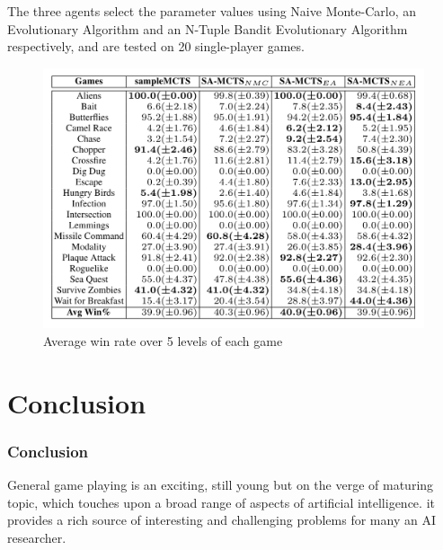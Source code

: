\documentclass{beamer}
\begin{document}
\begin{frame}[allowframebreaks]
  The three agents select the parameter values using Naive Monte-Carlo, an Evolutionary Algorithm and an N-Tuple Bandit Evolutionary Algorithm respectively, and are tested on 20 single-player games.

  \begin{figure}[c]
    \includegraphics[width=1\linewidth]{figures/figure1}
    \caption{ Average win rate over 5 levels of each game}
  \end{figure}
\end{frame}

\section{Conclusion}
\begin{frame}
  \frametitle{Conclusion}
  General game playing is an exciting, still young but on the verge of maturing topic, which touches upon a broad range of aspects of artificial intelligence. it provides a rich source of interesting and challenging problems for many an AI researcher.


\end{frame}
\end{document}
